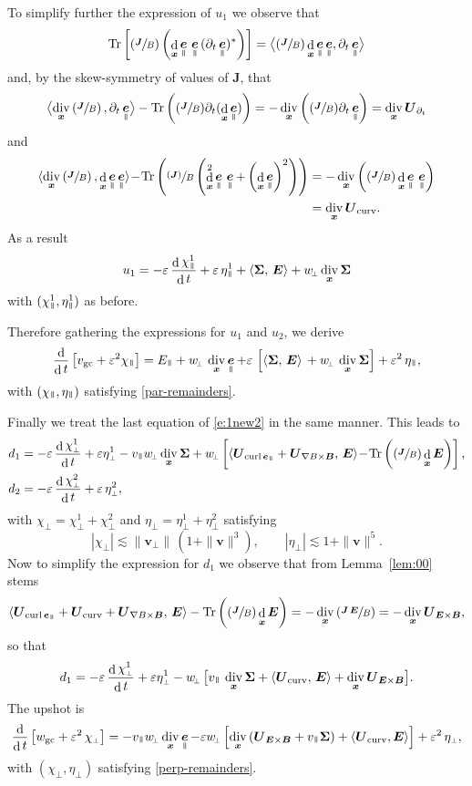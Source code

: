 \documentclass[JEP,XML,SOM,Unicode]{cedram}
\newcommand{\sperp}{{\scriptscriptstyle\perp}}
\newcommand{\blangle}{\bigl\langle}
\newcommand{\brangle}{\bigr\rangle}
\newcommand{\Psfrac}[2]{(\sfrac{#1}{#2})}
\newcommand{\psfrac}[2]{\sfrac{(#1)}{#2}}
\let\eps\varepsilon
\let\d\partial
\DeclareMathOperator\dD{d}\let\dd\dD
\DeclareMathOperator{\Tr}{Tr}
\DeclareMathOperator{\Div}{div}
\DeclareMathOperator{\Curl}{curl}
\theoremstyle{plain}
\theoremstyle{definition}
\newcommand{\be}{\begin{equation}}
\newcommand{\ee}{\end{equation}}
\newcommand\bB{{\boldsymbol B}}
\newcommand\bE{{\boldsymbol E}}
\newcommand\bJ{{\boldsymbol J}}
\newcommand\bU{{\boldsymbol U}}
\newcommand\bfv{{\boldsymbol v}}
\newcommand\bfx{{\boldsymbol x}}
\newcommand\Sig{{\boldsymbol \Sigma}}
\DeclareMathOperator{\beD}{\boldsymbol{e}}
\newcommand\eDpar{\beD_\mypar}
\newcommand\vpar{v_\mypar}
\newcommand\bvperp{\bfv_{\!\sperp}}
\newcommand\eperp{w_{\!\sperp}}
\newcommand\Epar{E_\mypar}
\newcommand{\eGC}{w_\mathrm{gc}}
\newcommand{\vGC}{v_\mathrm{gc}}
\newcommand{\EcB}{\bU_{\bE\times\bB}}
\newcommand{\gradB}{\bU_{\nabla B\times\bB}}
\newcommand{\curvB}{\bU_{\mathrm{curv}}}
\newcommand{\rotB}{\bU_{\Curl\eDpar}}
\newcommand{\dtB}{\bU_{\d_t}}
\newcommand{\mypar}{{\mkern3mu\vphantom{\perp}\vrule depth 0pt\mkern2mu\vrule depth 0pt\mkern3mu}}
\begin{document}
To simplify further the expression of $u_1$ we observe that
\[
\Tr\left[\Psfrac{\bJ}{B}\left(\dD_\bfx\eDpar\,\eDpar\,(\d_t\eDpar)^*\right)\right]
= \blangle\Psfrac{\bJ}{B}\dD_\bfx\eDpar\eDpar,\d_t\eDpar\brangle
\]
and, by the skew-symmetry of values of $\bJ$, that
\[
\blangle\Div_\bfx\left(\sfrac{\bJ}{B}\right),
\d_t\eDpar\brangle
-\Tr\left(\Psfrac{\bJ}{B}\d_t(\dD_\bfx\eDpar)\right) =-\Div_\bfx\left(\Psfrac{\bJ}{B}\d_t\eDpar\right)=\Div_\bfx\dtB
\]
and
\begin{align*}
\langle\Div_\bfx\left(\sfrac{\bJ}{B}\right),
\dD_\bfx\eDpar\eDpar\rangle
\!-\!\Tr\left(\psfrac{\bJ}{B}\left(\dD_{\bfx}^2\eDpar\,\eDpar+\left(\dD_{\bfx}\eDpar\right)^2\right)\right)
&=-\Div_\bfx\left(\Psfrac{\bJ}{B}\dD_\bfx\eDpar\,\eDpar\right)\\
& =\Div_\bfx\curvB.
\end{align*}
As a result
\[
u_1 = -\eps\,\frac{\dD\chi_\mypar^1}{\dD t}+\eps\,\eta_\mypar^1 +
\langle\Sig,\,\bE\rangle +\eperp\Div_\bfx\Sig
\]
with $(\chi_\mypar^1,\eta_\mypar^1)$ as before.

Therefore gathering the expressions for $u_1$ and $u_2$, we derive
\[
\frac{\dD }{\dD t}\left[\vGC+\eps^2\chi_\mypar\right]
= \Epar+\eperp\,\Div_\bfx\eDpar +\eps \,\left[\langle\Sig,\,\bE\rangle
\, + \eperp\,\Div_\bfx\Sig\right] + \eps^2\,\eta_\mypar,
\]
with $(\chi_\mypar,\eta_\mypar)$ satisfying \eqref{par-remainders}.

Finally we treat the last equation of \eqref{e:1new2} in the same manner. This leads to
\begin{align*}
d_1 &= -\eps\,\frac{\dD\chi_\sperp^1}{\dD t}+\eps\eta_\sperp^1 -
\vpar\eperp\Div_\bfx\Sig+\eperp\left[\langle \rotB + \gradB,\, \bE
\rangle \!-\!
\Tr\left(\Psfrac{\bJ}{B}\dD_{\bfx}\bE\right)\right],\\
d_2&=-\eps\,\frac{\dD\chi_\sperp^2}{\dD t}+\eps\,\eta_\sperp^2,
\end{align*}
with $\chi_\sperp=\chi^1_\sperp+\chi^2_\sperp$ and $\eta_\sperp=\eta_\sperp^1+\eta_\sperp^2$ satisfying
\be\label{perp-remainders}
|\chi_\sperp|\lesssim \|\bvperp\|\,(1+\|\bfv\|^3),\qquad
|\eta_\sperp|\lesssim 1+\|\bfv\|^5.
\ee
Now to simplify the expression for $d_1$ we observe that from Lemma~\ref{lem:00} stems
\[
\langle \rotB+\curvB + \gradB,\, \bE\rangle
-\Tr\left(\Psfrac{\bJ}{B}\dD_{\bfx}\bE\right) =
-\Div_\bfx\left( \sfrac{\bJ \,\bE}{B}\right) = -\Div_\bfx \EcB,
\]
so that
\[
d_1 = -\eps\,\frac{\dD\chi_\sperp^1}{\dD t}+\eps\eta_\sperp^1 -\eperp\,\bigl[\vpar\,\Div_\bfx\Sig+\langle \curvB,\, \bE\rangle +
\Div_\bfx\EcB \bigr].
\]
The upshot is
\[
\frac{\dD }{\dD t}\left[\eGC+\eps^2\,\chi_\sperp\right]
= -\vpar \eperp\Div_\bfx\eDpar
-\eps\eperp\left[\Div_\bfx \left(\EcB+ \vpar\Sig\right)+\langle \curvB,\bE\rangle \right] +\eps^2\,\eta_\sperp,
\]
with $(\chi_\sperp,\eta_\sperp)$ satisfying \eqref{perp-remainders}.
\end{document}
